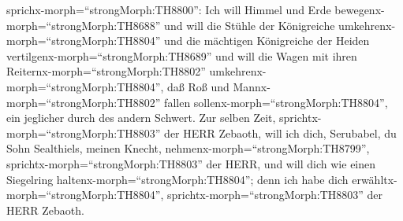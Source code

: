 sprichx-morph=``strongMorph:TH8800'': Ich will Himmel und Erde
bewegenx-morph=``strongMorph:TH8688''  und will die Stühle
der Königreiche umkehrenx-morph=``strongMorph:TH8804'' und die mächtigen
Königreiche der Heiden vertilgenx-morph=``strongMorph:TH8689'' und will
die Wagen mit ihren Reiternx-morph=``strongMorph:TH8802''
umkehrenx-morph=``strongMorph:TH8804'', daß Roß und
Mannx-morph=``strongMorph:TH8802'' fallen
sollenx-morph=``strongMorph:TH8804'', ein jeglicher durch des andern
Schwert.  Zur selben Zeit,
sprichtx-morph=``strongMorph:TH8803'' der HERR Zebaoth, will ich dich,
Serubabel, du Sohn Sealthiels, meinen Knecht,
nehmenx-morph=``strongMorph:TH8799'',
sprichtx-morph=``strongMorph:TH8803'' der HERR, und will dich wie einen
Siegelring haltenx-morph=``strongMorph:TH8804''; denn ich habe dich
erwähltx-morph=``strongMorph:TH8804'',
sprichtx-morph=``strongMorph:TH8803'' der HERR Zebaoth.
